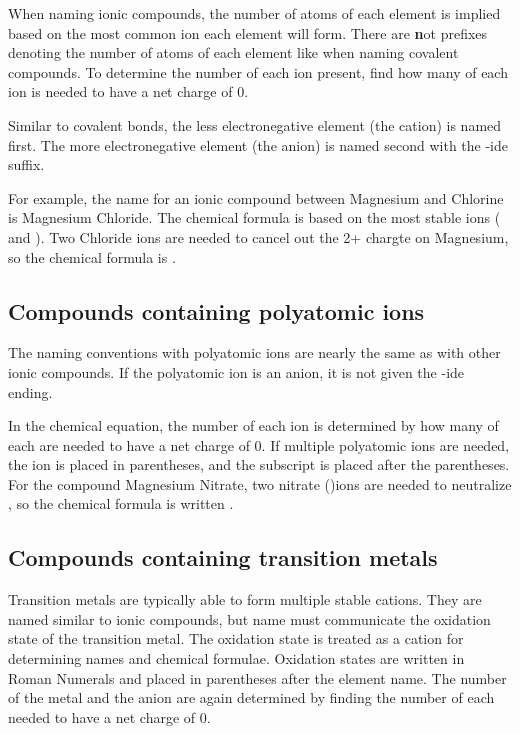 \documentclass[12pt, oneside, letterpaper]{book}
\begin{document}
When naming ionic compounds, the number of atoms of each element is implied based on the most common ion each element will form. There are {\textbf not} prefixes denoting the number of atoms of each element like when naming covalent compounds. To determine the number of each ion present, find how many of each ion is needed to have a net charge of 0. 

Similar to covalent bonds, the less electronegative element (the cation) is named first. The more electronegative element (the anion) is named second with the -ide suffix. 

For example, the name for an ionic compound between Magnesium and Chlorine is Magnesium Chloride. The chemical formula is based on the most stable ions ( and ). Two Chloride ions are needed to cancel out the 2+ chargte on Magnesium, so the chemical formula is .

\newpage

\subsection{ Compounds containing polyatomic ions}

The naming conventions with polyatomic ions are nearly the same as with other ionic compounds. If the polyatomic ion is an anion, it is not given the -ide ending. 

In the chemical equation, the number of each ion is determined by how many of each are needed to have a net charge of 0. If multiple polyatomic ions are needed, the ion is placed in parentheses, and the subscript is placed after the parentheses. For the compound Magnesium Nitrate, two nitrate ()ions are needed to neutralize , so the chemical formula is written .

\subsection{ Compounds containing transition metals}

Transition metals are typically able to form multiple stable cations. They are named similar to ionic compounds, but name must communicate the oxidation state of the transition metal. The oxidation state is treated as a cation for determining names and chemical formulae. Oxidation states are written in Roman Numerals and placed in parentheses after the element name. The number of the metal and the anion are again determined by finding the number of each needed to have a net charge of 0. 
\end{document}
